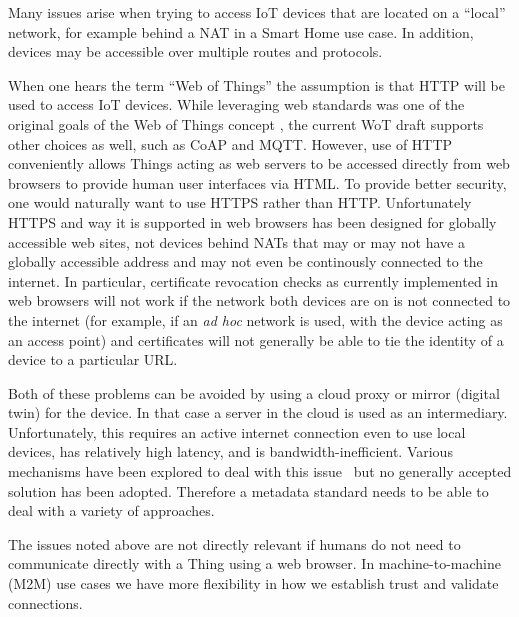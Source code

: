 Many issues arise when trying to access IoT devices
that are located on a ``local'' network,
for example behind a NAT in a Smart Home use case.
In addition, devices may be accessible over multiple
routes and protocols.

When one hears the term ``Web of Things'' the
assumption is that HTTP will be used to
access IoT devices. 
While leveraging web standards was one of the 
original goals of the Web of Things concept \cite{Ostermaier2010},
the current WoT draft supports other choices as well,
such as CoAP and MQTT.
However, use of HTTP conveniently
allows Things acting as web servers to be accessed directly
from web browsers to provide human user interfaces via HTML.  
To provide better security, one would
naturally want to use HTTPS rather than HTTP.
Unfortunately HTTPS and way it is supported in web browsers has
been designed for globally accessible web sites, not devices
behind NATs that may or may not have a globally accessible
address and may not even be continously connected to the internet.
In particular, certificate revocation checks as currently 
implemented in web browsers will not work if
the network both devices are on is not connected to the internet
(for example, if an \textit{ad hoc} network is used, with the device acting as
an access point) and certificates will not generally be able 
to tie the identity of a device to a particular URL. 

Both of these problems can be avoided by using a cloud proxy
or mirror (digital twin) for the device.
In that case a server
in the cloud is used as an intermediary.
Unfortunately,
this requires an active internet connection even to use 
local devices, has relatively high latency, and is
bandwidth-inefficient.
Various mechanisms have been explored to deal with this issue~\cite{httpslocal2017}
but no generally accepted solution has been adopted.
Therefore a metadata standard needs to be able to deal with a variety
of approaches.

The issues noted above are not directly relevant if humans do not need
to communicate directly with a Thing using a web browser.  
In machine-to-machine (M2M) use cases
we have more flexibility in how we establish trust and validate connections.

